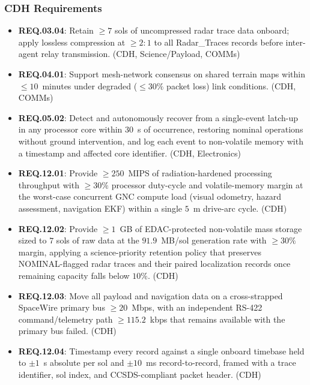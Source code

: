 \documentclass[11pt]{article}
\newcommand{\reqid}[1]{\textbf{#1}}
\begin{document}
\subsubsection{CDH Requirements}
\begin{itemize}[leftmargin=*]
    \item \reqid{REQ.03.04}: Retain $\geq 7$ sols of uncompressed radar trace data onboard;
    apply lossless compression at $\geq 2{:}1$ to all Radar\_Traces records before inter-agent
    relay transmission. (CDH, Science/Payload, COMMs)
    \item \reqid{REQ.04.01}: Support mesh-network consensus on shared terrain maps within
    $\leq 10$~minutes under degraded ($\leq 30\%$ packet loss) link conditions. (CDH, COMMs)
    \item \reqid{REQ.05.02}: Detect and autonomously recover from a single-event latch-up in
    any processor core within $30$~s of occurrence, restoring nominal operations without ground
    intervention, and log each event to non-volatile memory with a timestamp and affected core
    identifier. (CDH, Electronics)
    \item \reqid{REQ.12.01}: Provide $\geq 250$~MIPS of radiation-hardened processing
    throughput with $\geq 30\%$ processor duty-cycle and volatile-memory margin at the
    worst-case concurrent GNC compute load (visual odometry, hazard assessment, navigation EKF)
    within a single $5$~m drive-arc cycle. (CDH)
    \item \reqid{REQ.12.02}: Provide $\geq 1$~GB of EDAC-protected non-volatile mass storage
    sized to $7$ sols of raw data at the $91.9$~MB/sol generation rate with $\geq 30\%$ margin,
    applying a science-priority retention policy that preserves NOMINAL-flagged radar traces and
    their paired localization records once remaining capacity falls below $10\%$. (CDH)
    \item \reqid{REQ.12.03}: Move all payload and navigation data on a cross-strapped
    SpaceWire primary bus $\geq 20$~Mbps, with an independent RS-422 command/telemetry path
    $\geq 115.2$~kbps that remains available with the primary bus failed. (CDH)
    \item \reqid{REQ.12.04}: Timestamp every record against a single onboard timebase held to
    $\pm 1$~s absolute per sol and $\pm 10$~ms record-to-record, framed with a trace identifier,
    sol index, and CCSDS-compliant packet header. (CDH)
\end{itemize}
\end{document}
